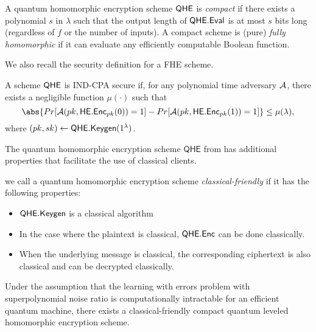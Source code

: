\begin{definition}
    A quantum homomorphic encryption scheme $\mathsf{QHE}$ is \emph{compact} if
    there exists a polynomial $s$ in $\lambda$ such that the output length of $\mathsf{QHE.Eval}$ is at most $s$ bits long (regardless of $f$ or
    the number of inputs). A compact scheme is (pure) \emph{fully homomorphic} if it can evaluate any efficiently computable
    Boolean function.
\end{definition}

We also recall the security definition for a FHE scheme.

\begin{definition}
    A scheme $\mathsf{QHE}$ is IND-CPA secure if, for any polynomial time adversary $\mathcal{A}$, there exists a negligible function $\mu(\cdot)$ such that
    $$\abs{Pr[\cA(pk, \mathsf{HE.Enc}_{pk}(0))=1]-Pr[\cA(pk, \mathsf{HE.Enc}_{pk}(1))=1]}\leq\mu(\lambda),$$
    where $(pk, sk)\leftarrow\mathsf{QHE.Keygen}(1^\lambda)$.
\end{definition}

The quantum homomorphic encryption scheme $\mathsf{QHE}$ from \cite{mahadev_qfhe} has additional properties that facilitate the use of classical clients.

\begin{definition} \label{def:classical-friendly}
    we call a quantum homomorphic encryption scheme \emph{classical-friendly} if it has the following properties:
    \begin{itemize}
        \item $\mathsf{QHE.Keygen}$ is a classical algorithm
        \item In the case where the plaintext is classical, $\mathsf{QHE.Enc}$ can be done classically.
        \item When the underlying message is classical, the corresponding ciphertext is also classical and can be decrypted classically.
    \end{itemize}
\end{definition}

\begin{theorem} 
    Under the assumption that the learning with errors problem with superpolynomial noise ratio is computationally intractable for an efficient quantum machine,
    there exists a classical-friendly compact quantum leveled homomorphic encryption scheme.
\end{theorem}


